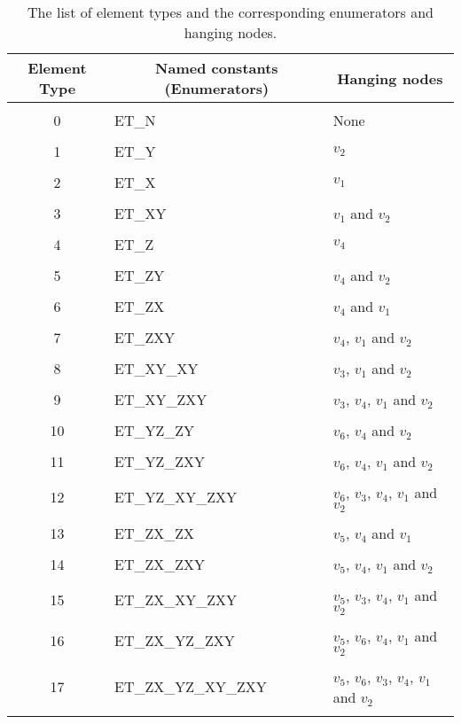 \documentclass[12pt,reqno,a4paper]{report}
\numberwithin{equation}{section}
\begin{document}
\begin{table}
	\centering
		\begin{tabular}{|c|l|l|}\hline
		\multicolumn{1}{|c}{Element Type} & \multicolumn{1}{|c}{Named constants (Enumerators)} & \multicolumn{1}{|c|}{Hanging nodes}\\\hline
		   & & \\
		 0 &  ET\_N     & None\\
		 & & \\
     1 &  ET\_Y    & $v_2$\\
     & & \\
     2 &  ET\_X    & $v_1$\\
     & & \\
     3 &  ET\_XY   & $v_1$ and $v_2$\\
     & & \\
     4 &  ET\_Z    & $v_4$\\
     & & \\
     5 &  ET\_ZY   & $v_4$ and $v_2$\\
     & & \\
     6 &  ET\_ZX   & $v_4$ and $v_1$\\
     & & \\
     7 &  ET\_ZXY   & $v_4$, $v_1$ and $v_2$\\
     & & \\
     8 &  ET\_XY\_XY   & $v_3$, $v_1$ and $v_2$\\
     & & \\
     9 &  ET\_XY\_ZXY   & $v_3$, $v_4$, $v_1$ and $v_2$\\
     & & \\
     10 & ET\_YZ\_ZY   & $v_6$, $v_4$ and $v_2$\\
     & & \\
     11 & ET\_YZ\_ZXY   & $v_6$, $v_4$, $v_1$ and $v_2$\\
     & & \\
     12 & ET\_YZ\_XY\_ZXY   & $v_6$, $v_3$, $v_4$, $v_1$ and $v_2$ \\
     & & \\
     13 & ET\_ZX\_ZX      & $v_5$, $v_4$ and $v_1$\\
     & & \\
     14 & ET\_ZX\_ZXY     & $v_5$, $v_4$, $v_1$ and $v_2$\\
     & & \\
     15 & ET\_ZX\_XY\_ZXY   & $v_5$, $v_3$, $v_4$, $v_1$ and $v_2$\\
     & & \\
     16 & ET\_ZX\_YZ\_ZXY    & $v_5$, $v_6$, $v_4$, $v_1$ and $v_2$ \\
     & & \\
     17 & ET\_ZX\_YZ\_XY\_ZXY   & $v_5$, $v_6$, $v_3$, $v_4$, $v_1$ and $v_2$ \\
     & & \\\hline     
		\end{tabular}
\caption{The list of element types and the corresponding enumerators and hanging nodes.}
\label{tab:etypes}
\end{table}
\end{document}
